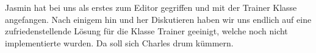 \documentclass[12pt,a4paper]{article} %
\begin{document}
	Jasmin hat bei uns als erstes zum Editor gegriffen und mit der Trainer Klasse angefangen. Nach einigem hin und her Diskutieren haben wir uns endlich auf eine zufriedenstellende Lösung für die Klasse Trainer geeinigt, welche noch nicht implementierte wurden. Da soll sich Charles drum kümmern.
\end{document}
